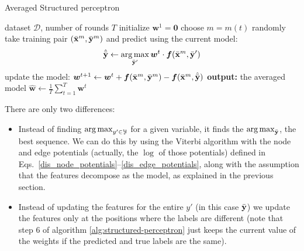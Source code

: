 \begin{algorithm}[t]
   \caption{Averaged Structured perceptron \label{alg:structured-perceptron}}
\begin{algorithmic}[1]
    dataset $\mathcal{D}$, number of rounds $T$
   \STATE initialize $\boldsymbol{w}^1 = \mathbf{0}$
	\STATE choose $m = m(t)$ randomly
	\STATE take training pair $(\bar{\mathbf{x}}^m, \bar{\mathbf{y}}^m)$ and predict using the current model: 
	$$\hat{\bar{\mathbf{y}}}  \leftarrow \operatorname*{arg\,max}_{\bar{\mathbf{y}}'} \boldsymbol{w}^t \cdot \boldsymbol{f}(\bar{\mathbf{x}}^m,\bar{\mathbf{y}}')$$
	\STATE update the model: 
	$\boldsymbol{w}^{t+1} \leftarrow \boldsymbol{w}^{t} + \boldsymbol{f}(\bar{\mathbf{x}}^m,\bar{\mathbf{y}}^m) - \boldsymbol{f}(\bar{\mathbf{x}}^m,\hat{\bar{\mathbf{y}}})$
	\ENDFOR
   \STATE \textbf{output:} the averaged model $\hat{\boldsymbol{w}} \leftarrow \frac{1}{T}\sum_{t=1}^T \boldsymbol{w}^t$
\end{algorithmic}
\end{algorithm}

There are only two differences:
\begin{itemize}
\item Instead of finding $\operatorname*{arg\,max}_{y'\in\mathcal{Y}}$ for a given
  variable, it finds the $\operatorname*{arg\,max}_{\bar{\mathbf{y}}}$, the best sequence. We can
  do this by using the Viterbi algorithm with the node and edge potentials 
  (actually, the $\log$ of those potentials) defined in Eqs.~\ref{dis_node_potentials}--\ref{dis_edge_potentials}, 
  along with the assumption that the features
  decompose as the model, as explained in the previous section.
\item Instead of updating the features for the entire $y'$ (in this
  case $\bar{\mathbf{y}}$) we update the features only at the positions where the
  labels are different (note that step 6 of algorithm \ref{alg:structured-perceptron} just keeps the current value of the weights if the predicted and true labels are the same).
\end{itemize}


